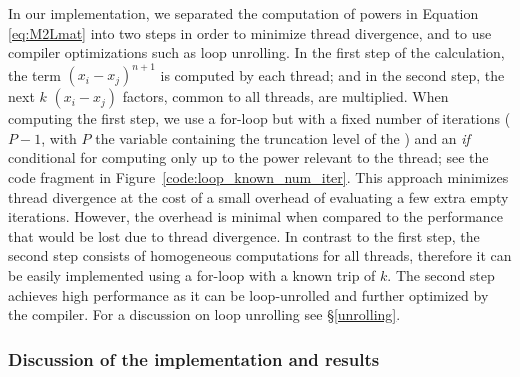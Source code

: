 In our implementation, we separated the computation of powers in Equation \eqref{eq:M2Lmat} into two steps in order to minimize thread divergence, and to use compiler optimizations such as loop unrolling. In the first step of the calculation, the term $(x_{i} - x_{j})^{n+1}$ is computed by each thread; and in the second step, the next $k$  $(x_{i} - x_{j})$ factors, common to all threads, are multiplied. When computing the first step, we use a for-loop but with a fixed number of iterations ($P-1$, with $P$ the variable containing the truncation level of the {\ME}) and an \emph{if} conditional for computing only up to the power relevant to the thread; see the code fragment in Figure~\ref{code:loop_known_num_iter}. This approach minimizes thread divergence at the cost of a small overhead of evaluating a few extra empty iterations. However, the overhead is minimal when compared to the performance that would be lost due to thread divergence. In contrast to the first step, the second step consists of homogeneous computations for all threads, therefore it can be easily implemented using a for-loop with a known trip of $k$. The second step achieves high performance as it can be loop-unrolled and further optimized by the compiler. For a discussion on loop unrolling see \S\ref{unrolling}.


\subsubsection{Discussion of the {\ML} {\gpu} implementation and results}

